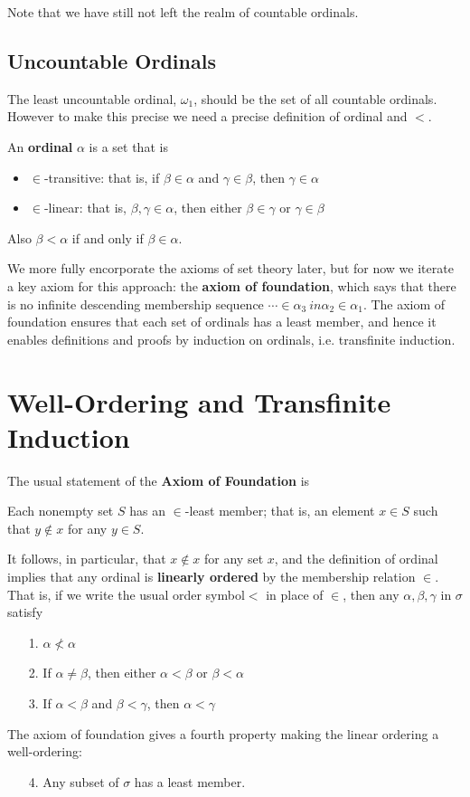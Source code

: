 \documentclass[12pt, a4paper, oneside, openright, titlepage]{book}
\begin{document}
Note that we have still not left the realm of countable ordinals.

\subsection{Uncountable Ordinals}

The least uncountable ordinal, $\omega_1$, should be the set of all countable ordinals. However to make this precise we need a precise definition of ordinal and $<$.

\begin{defn}
    An \textbf{ordinal} $\alpha$ is a set that is \begin{itemize}
        \item $\in$-transitive: that is, if $\beta \in \alpha$ and $\gamma \in \beta$, then $\gamma \in \alpha$
        \item $\in$-linear: that is, $\beta,\gamma \in \alpha$, then either $\beta \in \gamma$ or $\gamma \in \beta$
    \end{itemize}
    Also $\beta < \alpha$ if and only if $\beta\in \alpha$.
\end{defn}


We more fully encorporate the axioms of set theory later, but for now we iterate a key axiom for this approach: the \textbf{axiom of foundation}, which says that there is no infinite descending membership sequence $\cdots \in \alpha_3\ in \alpha_2 \in \alpha_1$. The axiom of foundation ensures that each set of ordinals has a least member, and hence it enables definitions and proofs by induction on ordinals, i.e. transfinite induction.


\section{Well-Ordering and Transfinite Induction}

The usual statement of the \textbf{Axiom of Foundation} is 
\begin{defn}
    Each nonempty set $S$ has an $\in$-least member; that is, an element $x \in S$ such that $y \notin x$ for any $y \in S$.
\end{defn}

It follows, in particular, that $x \notin x$ for any set $x$, and the definition of ordinal implies that any ordinal is \textbf{linearly ordered} by the membership relation $\in$. That is, if we write the usual order symbol$ <$ in place of $\in$, then any $\alpha,\beta,\gamma$ in $\sigma$ satisfy \begin{itemize}
    \item[1.] $\alpha \nless \alpha$
    \item[2.] If $\alpha \neq \beta$, then either $\alpha < \beta$ or $\beta < \alpha$
    \item[3.] If $\alpha < \beta$ and $\beta < \gamma$, then $\alpha < \gamma$
\end{itemize}
The axiom of foundation gives a fourth property making the linear ordering a well-ordering: 
\begin{itemize}
    \item[4.] Any subset of $\sigma$ has a least member.
\end{itemize}
\end{document}
